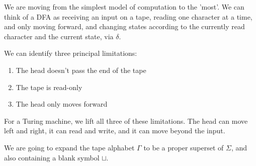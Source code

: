 We are moving from the simplest model of computation to the 'most'.  We can think of a DFA as receiving an input on a tape, reading one character at a time, and only moving forward, and changing states according to the currently read character and the current state, via $\delta$.

We can identify three principal limitations:

\begin{enumerate}
	\item The head doesn't pass the end of the tape
	\item The tape is read-only
	\item The head only moves forward
\end{enumerate}


For a Turing machine, we lift all three of these limitations.  The head can move left and right, it can read and write, and it can move beyond the input.

We are going to expand the tape alphabet $\Gamma$ to be a proper superset of $\Sigma$, and also containing a blank symbol $\sqcup$.


